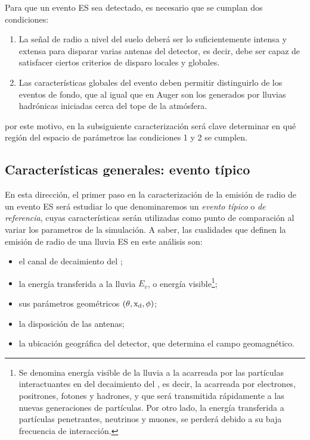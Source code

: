 Para que un evento ES sea detectado, es necesario que se cumplan dos condiciones:
\begin{enumerate}
 \item La se\~nal de radio a nivel del suelo deber\'a ser lo suficientemente intensa y extensa para disparar varias antenas del detector, es decir, debe ser capaz de satisfacer ciertos criterios de disparo locales y globales.
 \item Las caracter\'isticas globales del evento deben permitir distinguirlo de los eventos de fondo, que al igual que en Auger son los generados por lluvias hadr\'onicas iniciadas cerca del tope de la atm\'osfera.
\end{enumerate}
por este motivo, en la subsiguiente caracterizaci\'on ser\'a clave determinar en qu\'e regi\'on del espacio de par\'ametros las condiciones 1 y 2 se cumplen.

	\subsection{Caracter\'isticas generales: evento típico}
	
	En esta direcci\'on, el primer paso en la caracterizaci\'on de la emisión de radio de un evento ES ser\'a estudiar lo que denominaremos un \emph{evento típico} o \emph{de referencia}, cuyas caracter\'isticas ser\'an utilizadas como punto de comparaci\'on al variar los parametros de la simulaci\'on. 
	A saber, las cualidades que definen la emisi\'on de radio de una lluvia ES en este an\'alisis son: 
	\begin{itemize}
	 \item el canal de decaimiento del \tauon{};
	 \item la energía transferida a la lluvia $E_v$, o energ\'ia visible\footnote{Se denomina energ\'ia visible de la lluvia a la acarreada por las part\'iculas interactuantes en del decaimiento del \tauon{}, es decir, la acarreada por electrones, positrones, fotones y hadrones, y que ser\'a transmitida r\'apidamente a las nuevas generaciones de part\'iculas. Por otro lado, la energ\'ia transferida a part\'iculas penetrantes, neutrinos y muones, se perder\'a debido a su baja frecuencia de interacci\'on.};
	 \item sus parámetros geométricos $(\theta,{\rm x_d},\phi)$;
	 \item la disposici\'on de las antenas;
	 \item la ubicaci\'on geogr\'afica del detector, que determina el campo geomagn\'etico.
	 
	\end{itemize}

